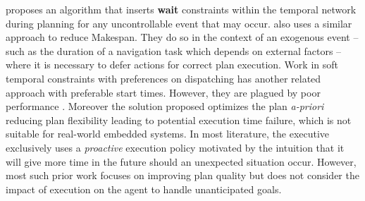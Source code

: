 
\cite{morris01} proposes an algorithm that inserts \textbf{wait}
constraints within the temporal network during planning for any
uncontrollable event that may occur. \cite{gallien2006} also uses a
similar approach to reduce Makespan. They do so in the context of an
exogenous event -- such as the duration of a navigation task which
depends on external factors -- where it is necessary to defer actions
for correct plan execution. Work in soft temporal constraints with
preferences \cite{khatib2001temporal} on dispatching has another
related approach with preferable start times. However, they are
plagued by poor performance \cite{bartak2002}. %
Moreover the solution proposed optimizes the plan {\em a-priori}
reducing plan flexibility leading to potential execution time failure,
which is not suitable for real-world embedded systems. In most
literature, the executive exclusively uses a {\em proactive} execution
policy motivated by the intuition that it will give more time in the
future should an unexpected situation occur. However, most such prior
work focuses on improving plan quality but does not consider the
impact of execution on the agent to handle unanticipated goals.

